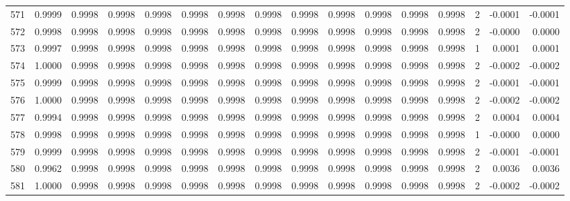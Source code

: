 \begin{tabular}{lrrrrrrrrrrrrrrr}
571 &      0.9999 &  0.9998 &  0.9998 &  0.9998 &  0.9998 &  0.9998 &  0.9998 &  0.9998 &  0.9998 &  0.9998 &   0.9998 &     0.9998 &      2 &                   -0.0001 &                    -0.0001 \\
572 &      0.9998 &  0.9998 &  0.9998 &  0.9998 &  0.9998 &  0.9998 &  0.9998 &  0.9998 &  0.9998 &  0.9998 &   0.9998 &     0.9998 &      2 &                   -0.0000 &                     0.0000 \\
573 &      0.9997 &  0.9998 &  0.9998 &  0.9998 &  0.9998 &  0.9998 &  0.9998 &  0.9998 &  0.9998 &  0.9998 &   0.9998 &     0.9998 &      1 &                    0.0001 &                     0.0001 \\
574 &      1.0000 &  0.9998 &  0.9998 &  0.9998 &  0.9998 &  0.9998 &  0.9998 &  0.9998 &  0.9998 &  0.9998 &   0.9998 &     0.9998 &      2 &                   -0.0002 &                    -0.0002 \\
575 &      0.9999 &  0.9998 &  0.9998 &  0.9998 &  0.9998 &  0.9998 &  0.9998 &  0.9998 &  0.9998 &  0.9998 &   0.9998 &     0.9998 &      2 &                   -0.0001 &                    -0.0001 \\
576 &      1.0000 &  0.9998 &  0.9998 &  0.9998 &  0.9998 &  0.9998 &  0.9998 &  0.9998 &  0.9998 &  0.9998 &   0.9998 &     0.9998 &      2 &                   -0.0002 &                    -0.0002 \\
577 &      0.9994 &  0.9998 &  0.9998 &  0.9998 &  0.9998 &  0.9998 &  0.9998 &  0.9998 &  0.9998 &  0.9998 &   0.9998 &     0.9998 &      2 &                    0.0004 &                     0.0004 \\
578 &      0.9998 &  0.9998 &  0.9998 &  0.9998 &  0.9998 &  0.9998 &  0.9998 &  0.9998 &  0.9998 &  0.9998 &   0.9998 &     0.9998 &      1 &                   -0.0000 &                     0.0000 \\
579 &      0.9999 &  0.9998 &  0.9998 &  0.9998 &  0.9998 &  0.9998 &  0.9998 &  0.9998 &  0.9998 &  0.9998 &   0.9998 &     0.9998 &      2 &                   -0.0001 &                    -0.0001 \\
580 &      0.9962 &  0.9998 &  0.9998 &  0.9998 &  0.9998 &  0.9998 &  0.9998 &  0.9998 &  0.9998 &  0.9998 &   0.9998 &     0.9998 &      2 &                    0.0036 &                     0.0036 \\
581 &      1.0000 &  0.9998 &  0.9998 &  0.9998 &  0.9998 &  0.9998 &  0.9998 &  0.9998 &  0.9998 &  0.9998 &   0.9998 &     0.9998 &      2 &                   -0.0002 &                    -0.0002 \\

\end{tabular}

